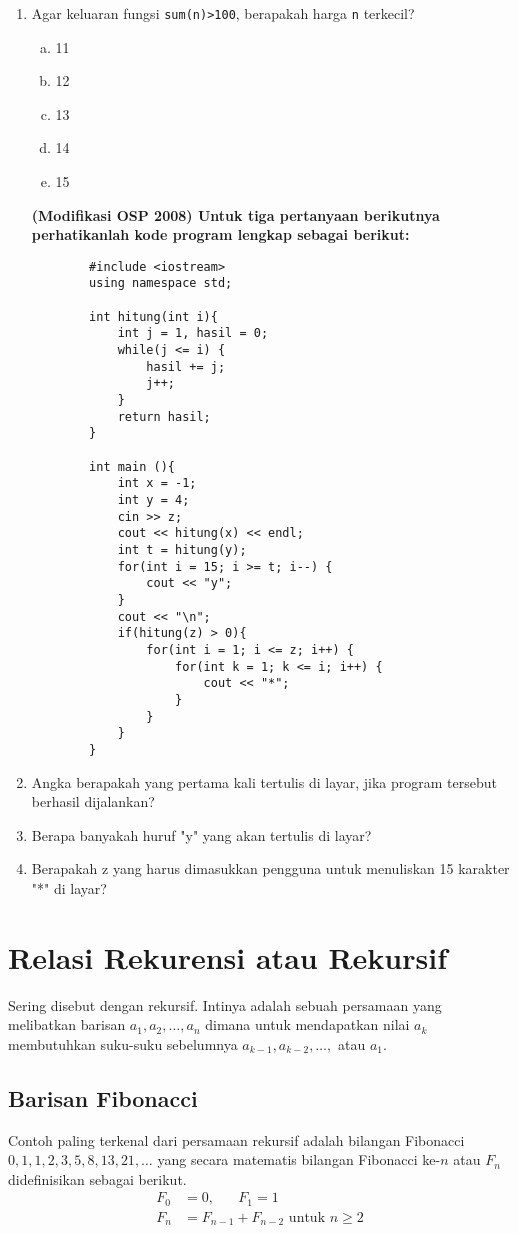 \begin{enumerate}
		\item Agar keluaran fungsi \verb*|sum(n)>100|, 
		berapakah harga \verb*|n| terkecil?
			\begin{enumerate}[a)]
				\item 11
				\item 12
				\item 13
				\item 14
				\item 15
			\end{enumerate}
			
		\textbf{(Modifikasi OSP 2008) Untuk tiga pertanyaan berikutnya perhatikanlah kode program lengkap sebagai berikut:}
		\begin{lstlisting}
		#include <iostream>
		using namespace std;
		
		int hitung(int i){
			int j = 1, hasil = 0;
			while(j <= i) {
				hasil += j;
				j++;
			}
			return hasil;
		}
		
		int main (){
			int x = -1;
			int y = 4;
			cin >> z;
			cout << hitung(x) << endl;
			int t = hitung(y);
			for(int i = 15; i >= t; i--) {
				cout << "y";
			}	
			cout << "\n";
			if(hitung(z) > 0){
				for(int i = 1; i <= z; i++) {
					for(int k = 1; k <= i; i++) {
						cout << "*";
					}
				}
			}
		}
		\end{lstlisting}
		\item Angka berapakah yang pertama kali tertulis di 
		layar, jika program tersebut berhasil dijalankan?
		\item Berapa banyakah huruf "y" yang akan tertulis di 
		layar?
		\item Berapakah z yang harus dimasukkan pengguna 
		untuk menuliskan 15 karakter "*" di layar? 
	\end{enumerate}
	     
	\section{Relasi Rekurensi atau Rekursif}
		    Sering disebut dengan rekursif. Intinya adalah sebuah persamaan yang melibatkan barisan $a_1, a_2, \dots , a_n$ dimana untuk mendapatkan nilai $a_k$ membutuhkan suku-suku sebelumnya $a_{k-1}, a_{k-2}, \dots,$ atau $a_1$. 
		    
		    \subsection{Barisan Fibonacci}
		    Contoh paling terkenal dari persamaan rekursif adalah bilangan Fibonacci $0,1,1,2,3,5,8,13,21,\dots$ yang secara matematis bilangan Fibonacci ke-$n$ atau $F_n$ didefinisikan sebagai berikut.
		    \begin{align*}
		        F_0 &= 0, \hspace{20pt} F_1 = 1\\
		        F_n &= F_{n-1}+F_{n-2} \text{ untuk } n \ge 2
		    \end{align*}
		    
